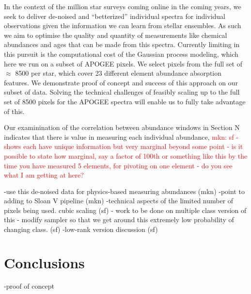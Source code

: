 \documentclass[a4paper,fleqn,usenatbib]{mnras}
\begin{document}
 In the context of the million star surveys coming online in the coming years, we seek to deliver  de-noised and ``betterized'' individual spectra for individual observations given the information we can learn from stellar ensembles. As such we aim to optimise the quality and quantity of measurements like chemical abundances and ages that can be made from this spectra. Currently limiting in this pursuit is the computational cost of the Gaussian process modeling, which here we run on a subset of APOGEE pixels. We select pixels from the full set of $\approx$ 8500 per star, which  cover 23 different element abundance absorption features. We demonstrate proof of concept and success of this approach on our subset of data.  Solving the technical challenges of feasibly scaling up to the full set of 8500 pixels for the APOGEE spectra will enable us to fully take advantage of this.
 
 Our examinination of the correlation between abundance windows in Section N indicates that there is value in measuring each individual abundance, \textcolor{red}{mkn: sf  - shows each have unique information but very marginal beyond some point - is it possible to state how marginal, say a factor of 100th or something like this by the time you have measured 5 elements, for pivoting on one element - do you see what I am getting at here? }

-use this de-noised data for physics-based measuring abundances (mkn)
-point to adding to Sloan V pipeline (mkn)
-technical aspects of the limited number of pixels being used. cubic scaling (sf)
- work to be done on multiple class version of this - modify sampler so that we get around this extremely low probability of changing class. (sf) 
-low-rank version discussion (sf) 


\section{Conclusions}
-proof of concept
\end{document}
